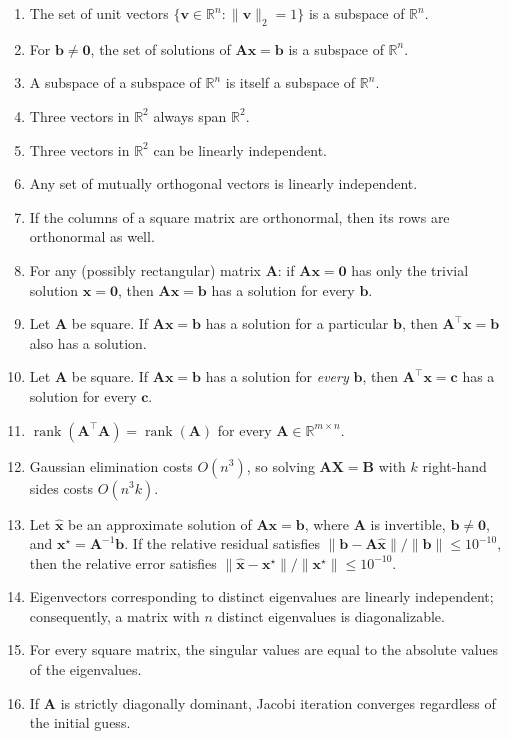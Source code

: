 \begin{exercise}
\begin{enumerate}[label=(\alphalphenum*)]
        \item The set of unit vectors $\{\mathbf{v} \in \mathbb{R}^n : \|\mathbf{v}\|_2 = 1\}$ is a subspace of $\mathbb{R}^n$.
        \item For $\mathbf{b} \neq \mathbf{0}$, the set of solutions of $\mathbf{A}\mathbf{x} = \mathbf{b}$ is a subspace of $\mathbb{R}^n$.
        \item A subspace of a subspace of $\mathbb{R}^n$ is itself a subspace of $\mathbb{R}^n$.
        \item Three vectors in $\mathbb{R}^2$ always span $\mathbb{R}^2$.
        \item Three vectors in $\mathbb{R}^2$ can be linearly independent.
        \item Any set of mutually orthogonal vectors is linearly independent.
        \item If the columns of a square matrix are orthonormal, then its rows are orthonormal as well.
        \item For any (possibly rectangular) matrix $\mathbf{A}$: if $\mathbf{A}\mathbf{x}=\mathbf{0}$ has only the trivial solution $\mathbf{x}=\mathbf{0}$, then $\mathbf{A}\mathbf{x}=\mathbf{b}$ has a solution for every $\mathbf{b}$.
        \item Let $\mathbf{A}$ be square. If $\mathbf{A}\mathbf{x}=\mathbf{b}$ has a solution for a particular $\mathbf{b}$, then $\mathbf{A}^\top\mathbf{x}=\mathbf{b}$ also has a solution.
        \item Let $\mathbf{A}$ be square. If $\mathbf{A}\mathbf{x}=\mathbf{b}$ has a solution for \emph{every} $\mathbf{b}$, then $\mathbf{A}^\top\mathbf{x}=\mathbf{c}$ has a solution for every $\mathbf{c}$.
        \item $\operatorname{rank}(\mathbf{A}^\top\mathbf{A}) = \operatorname{rank}(\mathbf{A})$ for every $\mathbf{A} \in \mathbb{R}^{m \times n}$.
        \item Gaussian elimination costs $O(n^3)$, so solving $\mathbf{A}\mathbf{X} = \mathbf{B}$ with $k$ right-hand sides costs $O(n^3 k)$.
        \item Let $\hat{\mathbf{x}}$ be an approximate solution of $\mathbf{A}\mathbf{x}=\mathbf{b}$, where $\mathbf{A}$ is invertible, $\mathbf{b} \neq \mathbf{0}$, and $\mathbf{x}^\star = \mathbf{A}^{-1}\mathbf{b}$. If the relative residual satisfies $\|\mathbf{b}-\mathbf{A}\hat{\mathbf{x}}\|/\|\mathbf{b}\| \leq 10^{-10}$, then the relative error satisfies $\|\hat{\mathbf{x}}-\mathbf{x}^\star\|/\|\mathbf{x}^\star\| \leq 10^{-10}$.
        \item Eigenvectors corresponding to distinct eigenvalues are linearly independent; consequently, a matrix with $n$ distinct eigenvalues is diagonalizable.
        \item For every square matrix, the singular values are equal to the absolute values of the eigenvalues.
        \item If $\mathbf{A}$ is strictly diagonally dominant, Jacobi iteration converges regardless of the initial guess.
    \end{enumerate}
\end{exercise}


